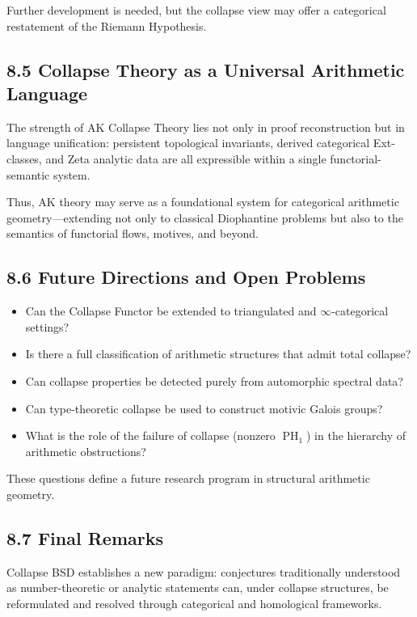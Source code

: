 \documentclass[11pt]{article}
\DeclareMathOperator{\PH}{PH}
\begin{document}
Further development is needed, but the collapse view may offer a categorical restatement of the Riemann Hypothesis.

\subsection{8.5 Collapse Theory as a Universal Arithmetic Language}

The strength of AK Collapse Theory lies not only in proof reconstruction but in language unification:  
persistent topological invariants, derived categorical Ext-classes, and Zeta analytic data are all expressible within a single functorial-semantic system.

Thus, AK theory may serve as a foundational system for categorical arithmetic geometry—extending not only to classical Diophantine problems but also to the semantics of functorial flows, motives, and beyond.

\subsection{8.6 Future Directions and Open Problems}

\begin{itemize}
  \item Can the Collapse Functor be extended to triangulated and $\infty$-categorical settings?
  \item Is there a full classification of arithmetic structures that admit total collapse?
  \item Can collapse properties be detected purely from automorphic spectral data?
  \item Can type-theoretic collapse be used to construct motivic Galois groups?
  \item What is the role of the failure of collapse (nonzero $\PH_1$) in the hierarchy of arithmetic obstructions?
\end{itemize}

These questions define a future research program in structural arithmetic geometry.

\subsection{8.7 Final Remarks}

Collapse BSD establishes a new paradigm:  
conjectures traditionally understood as number-theoretic or analytic statements can, under collapse structures, be reformulated and resolved through categorical and homological frameworks.
\end{document}
